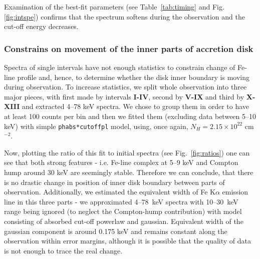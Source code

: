 \documentclass[a4paper,fleqn,usenatbib]{mnras}
\begin{document}
Examination of the best-fit parameters (see Table~\ref{tab:timing} and Fig.\ref{fig:intspe}) confirms that the spectrum softens during the observation and the cut-off energy decreases. 

\subsubsection{Constrains on movement of the inner parts of accretion disk}
Spectra of single intervals have not enough statistics to constrain change of Fe-line profile and, hence, to determine whether the disk inner boundary  is moving during observation. 
To increase statistics, we split whole observation into three major pieces, with first made by intervals {\bf I-IV}, second by {\bf V-IX} and third by {\bf X-XIII} and extracted 4--78 keV spectra. 
We chose to group them in order to have at least 100 counts per bin and then we fitted them (excluding data between 5--10 keV) with simple \texttt{phabs*cutoffpl} model, using, once again, $N_{H} = 2.15\times10^{22}$ cm$^{-2}$.  

Now, plotting the ratio of this fit to initial spectra (see Fig.~\ref{fig:ratios}) one can see that both strong features - i.e. Fe-line complex at 5--9 keV and Compton hump around 30 keV are seemingly stable. 
Therefore we can conclude, that there is no drastic change in position of inner disk boundary between parts of observation. 
Additionally, we estimated the equivalent width of  Fe K$\alpha$ emission line in this three parts - we approximated 4--78~keV spectra with 10--30~keV range being ignored (to neglect the Compton-hump contribution) with model consisting of absorbed cut-off powerlaw and gaussian. 
Equivalent width of the gaussian component is around 0.175 keV and remains constant along the observation within error margins, although it is possible that the quality of data is not enough to trace the real change.
\end{document}
